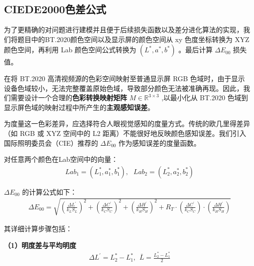 \subsection[\hspace{-2pt}CIEDE2000色差公式]{{\heiti{} \hspace{-8pt}CIEDE2000色差公式}}\label{subsection2: CIEDE2000色差公式}

为了更精确的对问题进行建模并且便于后续损失函数以及差分进化算法的实现，我们将题目中的BT.2020颜色空间以及显示屏的颜色空间从 xy 色度坐标转换为 XYZ 颜色空间，再利用 Lab 颜色空间公式转换为 $(L^{*},a^{*},b^{*})$ 。最后计算 $\Delta E_{00}$ 损失值。

在将 BT.2020 高清视频源的色彩空间映射至普通显示屏 RGB 色域时，由于显示设备色域较小，无法完整覆盖原始色域，导致部分颜色无法被准确再现。因此，我们需要设计一个合理的\textbf{色彩转换映射矩阵} $M\in \mathbb{R}^{3\times 3}$ ,以最小化从 BT.2020 色域到显示屏色域的映射过程中所产生的\textbf{主观感知误差}。

为度量这一色彩差异，应选择符合人眼视觉感知的度量方式。传统的欧几里得差异（如 RGB 或 XYZ 空间中的 L2 距离）不能很好地反映颜色感知误差。我们引入国际照明委员会（CIE）推荐的 $\Delta E_{00}$ 作为感知误差的度量函数。

对任意两个颜色在Lab空间中的向量：
\begin{equation}
\begin{aligned}
  &Lab_{1} = (L^{*}_{1},a^{*}_{1},b^{*}_{1}),\ \ \ Lab_{2}=(L^{*}_{2},a^{*}_{2},b^{*}_{2})
\end{aligned}
\end{equation}

$\Delta E_{00}$ 的计算公式如下\cite{YSZL200407020}：
\begin{equation}
\begin{aligned}
  &\Delta E_{00}=\sqrt{(\frac{\Delta L^{'}}{k_{L}S_{L}})^{2}+(\frac{\Delta C^{'}}{k_{C}S_{C}})^{2}+(\frac{\Delta H^{'}}{k_{H}S_{H}})^{2}+R_{T}\cdot{(\frac{\Delta C^{'}}{k_{C}S_{C}})}\cdot (\frac{\Delta H^{'}}{k_{H}S_{H}})}
\end{aligned}
\end{equation}

其详细计算步骤包括：

\textbf{（1）明度差与平均明度}
\begin{equation}
\begin{aligned}
   &\Delta L^{'} = L^{*}_{2}-L^{*}_{1},\ \ \overline{L}=\frac{L^{*}_{2}-L^{*}_{1}}{2}
\end{aligned}
\end{equation}

